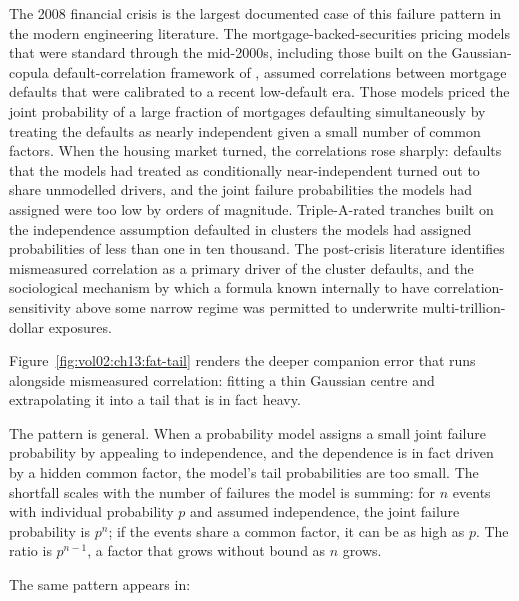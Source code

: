 The 2008 financial crisis is the largest documented case of this
failure pattern in the modern engineering literature. The
mortgage-backed-securities pricing models that were standard
through the mid-2000s, including those built on the Gaussian-copula
default-correlation framework of \textcite{paper:v2ch13-li-gaussian-copula},
assumed correlations between mortgage defaults that were calibrated
to a recent low-default era. Those models priced the joint
probability of a large fraction of mortgages defaulting
simultaneously by treating the defaults as nearly independent given
a small number of common factors. When the housing market turned,
the correlations rose sharply: defaults that the models had treated
as conditionally near-independent turned out to share unmodelled
drivers, and the joint failure probabilities the models had assigned
were too low by orders of magnitude. Triple-A-rated tranches built
on the independence assumption defaulted in clusters the models
had assigned probabilities of less than one in ten thousand. The post-crisis literature
\cite{paper:v2ch13-acharya-richardson-2009,text:v2ch13-mackenzie-engine}
identifies mismeasured correlation as a primary driver of the
cluster defaults, and the sociological mechanism by which a
formula known internally to have correlation-sensitivity above some
narrow regime was permitted to underwrite multi-trillion-dollar
exposures.

Figure~\ref{fig:vol02:ch13:fat-tail} renders the deeper companion
error that runs alongside mismeasured correlation: fitting a thin
Gaussian centre and extrapolating it into a tail that is in fact
heavy.



The pattern is general. When a probability model assigns a small
joint failure probability by appealing to independence, and the
dependence is in fact driven by a hidden common factor, the model's
tail probabilities are too small. The shortfall scales with the
number of failures the model is summing: for $n$ events with
individual probability $p$ and assumed independence, the joint
failure probability is $p^{n}$; if the events share a common
factor, it can be as high as $p$. The ratio is $p^{n - 1}$, a
factor that grows without bound as $n$ grows.

The same pattern appears in:


